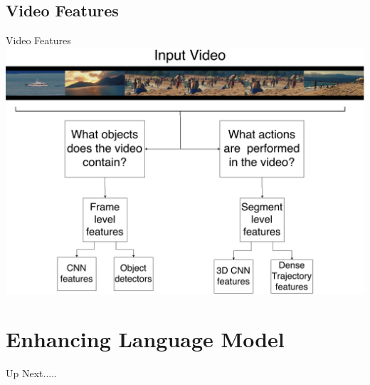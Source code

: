 \documentclass{beamer}
\begin{document}
\subsection{Video Features}
\begin{frame}{Video Features}
    \centering
    \includegraphics[width=1.0\textwidth]{images/VideoFeatures.pdf}
\end{frame}
\section{Enhancing Language Model}
\begin{frame}{Up Next.....}
\tableofcontents[currentsection] 
\end{frame}
\end{document}

